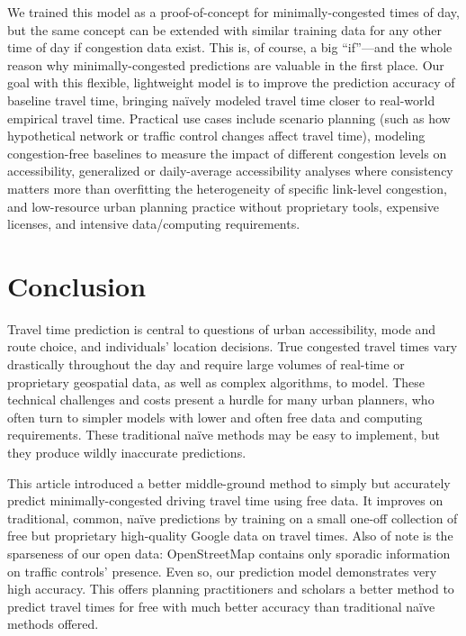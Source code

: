 \documentclass[12pt,letterpaper]{article} %
\begin{document}
We trained this model as a proof-of-concept for minimally-congested times of day, but the same concept can be extended with similar training data for any other time of day if congestion data exist. This is, of course, a big \enquote{if}---and the whole reason why minimally-congested predictions are valuable in the first place. Our goal with this flexible, lightweight model is to improve the prediction accuracy of baseline travel time, bringing naïvely modeled travel time closer to real-world empirical travel time. Practical use cases include scenario planning (such as how hypothetical network or traffic control changes affect travel time), modeling congestion-free baselines to measure the impact of different congestion levels on accessibility, generalized or daily-average accessibility analyses where consistency matters more than overfitting the heterogeneity of specific link-level congestion, and low-resource urban planning practice without proprietary tools, expensive licenses, and intensive data/computing requirements.

\section{Conclusion}

Travel time prediction is central to questions of urban accessibility, mode and route choice, and individuals' location decisions. True congested travel times vary drastically throughout the day and require large volumes of real-time or proprietary geospatial data, as well as complex algorithms, to model. These technical challenges and costs present a hurdle for many urban planners, who often turn to simpler models with lower and often free data and computing requirements. These traditional naïve methods may be easy to implement, but they produce wildly inaccurate predictions.

This article introduced a better middle-ground method to simply but accurately predict minimally-congested driving travel time using free data. It improves on traditional, common, naïve predictions by training on a small one-off collection of free but proprietary high-quality Google data on travel times. Also of note is the sparseness of our open data: OpenStreetMap contains only sporadic information on traffic controls' presence. Even so, our prediction model demonstrates very high accuracy. This offers planning practitioners and scholars a better method to predict travel times for free with much better accuracy than traditional naïve methods offered.
\end{document}
